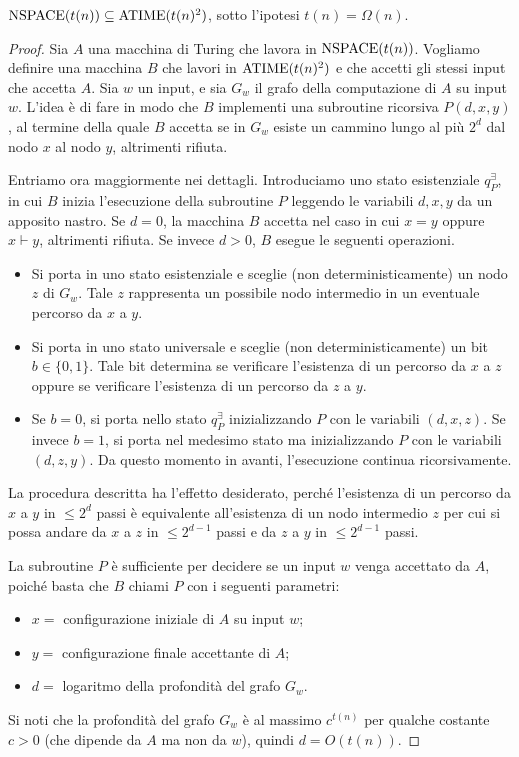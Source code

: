 \begin{teorema}
  \label{thm:nspace-atime}
  $\operatorname{NSPACE}(t(n)) \subseteq \operatorname{ATIME}(t(n)^2)$, sotto l'ipotesi $t(n) = \Omega(n)$.
\end{teorema}

\begin{proof}
  Sia $A$ una macchina di Turing che lavora in $\operatorname{NSPACE}(t(n))$. Vogliamo definire una macchina $B$ che lavori in $\operatorname{ATIME}(t(n)^2)$ e che accetti gli stessi input che accetta $A$.
  Sia $w$ un input, e sia $G_w$ il grafo della computazione di $A$ su input $w$.
  L'idea è di fare in modo che $B$ implementi una subroutine ricorsiva $P(d,x,y)$, al termine della quale $B$ accetta se in $G_w$ esiste un cammino lungo al più $2^d$ dal nodo $x$ al nodo $y$, altrimenti rifiuta.
  
  Entriamo ora maggiormente nei dettagli. Introduciamo uno stato esistenziale $q_P^\exists$, in cui $B$ inizia l'esecuzione della subroutine $P$ leggendo le variabili $d,x,y$ da un apposito nastro.
  Se $d=0$, la macchina $B$ accetta nel caso in cui $x=y$ oppure $x\vdash y$, altrimenti rifiuta.
  Se invece $d>0$, $B$ esegue le seguenti operazioni.
  \begin{itemize}
    \item Si porta in uno stato esistenziale e sceglie (non deterministicamente) un nodo $z$ di $G_w$.
    Tale $z$ rappresenta un possibile nodo intermedio in un eventuale percorso da $x$ a $y$.
    \item Si porta in uno stato universale e sceglie (non deterministicamente) un bit $b\in\{0,1\}$.
    Tale bit determina se verificare l'esistenza di un percorso da $x$ a $z$ oppure se verificare l'esistenza di un percorso da $z$ a $y$.
    \item Se $b=0$, si porta nello stato $q_P^\exists$ inizializzando $P$ con le variabili $(d,x,z)$. Se invece $b=1$, si porta nel medesimo stato ma inizializzando $P$ con le variabili $(d,z,y)$.
    Da questo momento in avanti, l'esecuzione continua ricorsivamente.
  \end{itemize}
  La procedura descritta ha l'effetto desiderato, perché l'esistenza di un percorso da $x$ a $y$ in $\leq 2^d$ passi è equivalente all'esistenza di un nodo intermedio $z$ per cui si possa andare da $x$ a $z$ in $\leq 2^{d-1}$ passi e da $z$ a $y$ in $\leq 2^{d-1}$ passi.
  
  La subroutine $P$ è sufficiente per decidere se un input $w$ venga accettato da $A$, poiché basta che $B$ chiami $P$ con i seguenti parametri:
  \begin{itemize}
    \renewcommand{\labelitemi}{--}
    \item $x = $ configurazione iniziale di $A$ su input $w$;
    \item $y = $ configurazione finale accettante di $A$;
    \item $d = $ logaritmo della profondità del grafo $G_w$.
  \end{itemize}
  Si noti che la profondità del grafo $G_w$ è al massimo $c^{t(n)}$ per qualche costante $c>0$ (che dipende da $A$ ma non da $w$), quindi $d=O(t(n))$.
  

\end{proof}
